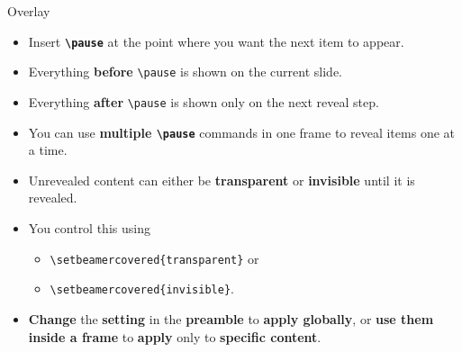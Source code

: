 \documentclass[aspectratio=169]{beamer}
\begin{document}
\begin{frame}{Overlay}
    \pause
    \vspace{0.3cm}
    \begin{minipage}[t]{0.49\textwidth}
        \begin{coloredblock}
            \begin{itemize}
                \item \footnotesize Insert \textbf{\texttt{\textbackslash pause}} at the point where you want the next item to appear.
                \item \footnotesize Everything \textbf{before} \texttt{\textbackslash pause} is shown on the current slide.
                \item \footnotesize Everything \textbf{after} \texttt{\textbackslash pause} is shown only on the next reveal step.
                \item \footnotesize You can use \textbf{multiple \texttt{\textbackslash pause}} commands in one frame to reveal items one at a time.
            \end{itemize}
        \end{coloredblock}
    \end{minipage}
    \hfill
    \pause
    \begin{minipage}[t]{0.49\textwidth}
        \begin{coloredblock}
            \begin{itemize}
               \item \footnotesize Unrevealed content can either be \textbf{transparent} or \textbf{invisible} until it is revealed.
                \item \footnotesize You control this using 
                \begin{itemize}
                    \item \texttt{\textbackslash setbeamercovered\{transparent\}} or
                    \item \texttt{\textbackslash setbeamercovered\{invisible\}}.
                \end{itemize}
                \item \footnotesize \textbf{Change} the \textbf{setting} in the \textbf{preamble} to \textbf{apply globally}, or \textbf{use them inside a frame} to \textbf{apply} only to \textbf{specific content}.
            \end{itemize}
        \end{coloredblock}
    \end{minipage}

\end{frame}
\end{document}
